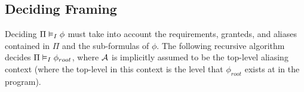 \newpage
\subsection{Deciding Framing}

Deciding $\Pi \vDash_I \phi$ must take into account the requirements, granteds, and aliases contained in $\Pi$ and the sub-formulas of $\phi$.
The following recursive algorithm decides $\Pi \vDash_I \phi_{root}$, where $\mathcal{A}$ is implicitly assumed to be the top-level aliasing context (where the top-level in this context is the level that $\phi_{root}$ exists at in the program).

